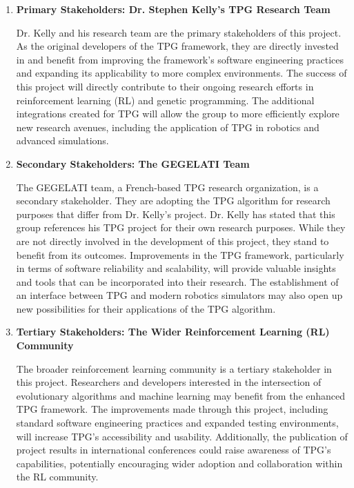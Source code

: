 \documentclass{article}
\begin{document}
\begin{enumerate} [leftmargin=*]

  \item \textbf{Primary Stakeholders: Dr. Stephen Kelly’s TPG Research Team}

    Dr. Kelly and his research team are the primary stakeholders of this project. As the original developers of the TPG framework, they are directly invested in and benefit from improving the framework’s software engineering practices and expanding its applicability to more complex environments. The success of this project will directly contribute to their ongoing research efforts in reinforcement learning (RL) and genetic programming. The additional integrations created for TPG will allow the group to more efficiently explore new research avenues, including the application of TPG in robotics and advanced simulations.

\item \textbf{Secondary Stakeholders: The GEGELATI Team}

       The GEGELATI team, a French-based TPG research organization, is a secondary stakeholder. They are adopting the TPG algorithm for research purposes that differ from Dr. Kelly’s project. Dr. Kelly has stated that this group references his TPG project for their own research purposes. While they are not directly involved in the development of this project, they stand to benefit from its outcomes. Improvements in the TPG framework, particularly in terms of software reliability and scalability, will provide valuable insights and tools that can be incorporated into their research. The establishment of an interface between TPG and modern robotics simulators may also open up new possibilities for their applications of the TPG algorithm.

 \item \textbf{Tertiary Stakeholders: The Wider Reinforcement Learning (RL) Community}

         The broader reinforcement learning community is a tertiary stakeholder in this project. Researchers and developers interested in the intersection of evolutionary algorithms and machine learning may benefit from the enhanced TPG framework. The improvements made through this project, including standard software engineering practices and expanded testing environments, will increase TPG’s accessibility and usability. Additionally, the publication of project results in international conferences could raise awareness of TPG’s capabilities, potentially encouraging wider adoption and collaboration within the RL community.


\end{enumerate}
\end{document}
